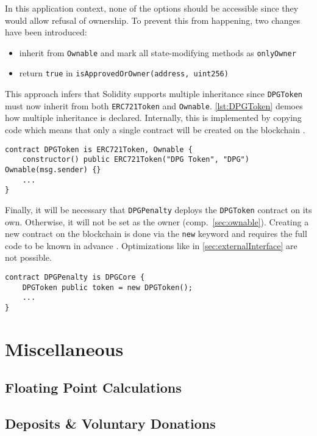 In this application context, none of the options should be accessible since they would allow refusal of ownership. To prevent this from happening, two changes have been introduced: 

\begin{itemize}
  \item inherit from \texttt{Ownable} and mark all state-modifying methods as \texttt{onlyOwner}
  \item return \texttt{true} in \texttt{isApprovedOrOwner(address, uint256)}
\end{itemize}

This approach infers that Solidity supports multiple inheritance since \texttt{DPGToken} must now inherit from both \texttt{ERC721Token} and \texttt{Ownable}. \autoref{lst:DPGToken} demoes how multiple inheritance is declared. Internally, this is implemented by copying code which means that only a single contract will be created on the blockchain \cite[p.~88]{solidityDocs}. 

\begin{lstlisting}[language=Solidity, caption=Multiple inheritance by DPGToken, label=lst:DPGToken]
contract DPGToken is ERC721Token, Ownable {
	constructor() public ERC721Token("DPG Token", "DPG") Ownable(msg.sender) {}
	...
}
\end{lstlisting}

Finally, it will be necessary that \texttt{DPGPenalty} deploys the \texttt{DPGToken} contract on its own. Otherwise, it will not be set as the owner (comp.~\ref{sec:ownable}). Creating a new contract on the blockchain is done via the \texttt{new} keyword and requires the full code to be known in advance \cite[p.~71]{solidityDocs}. Optimizations like in \autoref{sec:externalInterface} are not possible. 

\begin{lstlisting}[language=Solidity, caption=Creating a contract from a contract, label=lst:DPGTokenCreation]
contract DPGPenalty is DPGCore {
	DPGToken public token = new DPGToken();
	...
}
\end{lstlisting}

\pagebreak

\section{Miscellaneous}
\subsection{Floating Point Calculations}
\subsection{Deposits \& Voluntary Donations}






















